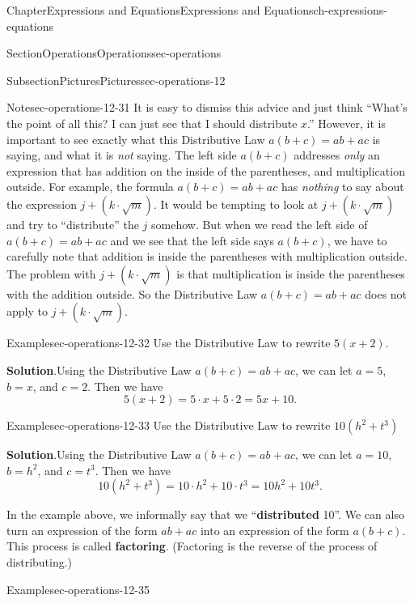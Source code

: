 \documentclass[twoside,11pt,]{book}
\newcommand{\blocktitlefont}{\relax}
\newcommand{\terminology}[1]{\textbf{#1}}
\numberwithin{equation}{chapter}
\begin{document}
\begin{chapterptx}{Chapter}{Expressions and Equations}{}{Expressions and Equations}{}{}{ch-expressions-equations}
\begin{sectionptx}{Section}{Operations}{}{Operations}{}{}{sec-operations}
\begin{subsectionptx}{Subsection}{Pictures}{}{Pictures}{}{}{sec-operations-12}
\begin{note}{Note}{}{sec-operations-12-31}
It is easy to dismiss this advice and just think ``What's the point of all this? I can just see that I should distribute \(x\).'' However, it is important to see exactly what this Distributive Law \(a(b+c)=ab+ac\) is saying, and what it is \emph{not} saying. The left side \(a(b+c)\) addresses \emph{only} an expression that has addition on the inside of the parentheses, and multiplication outside. For example, the formula \(a(b+c)=ab+ac\) has \emph{nothing} to say about the expression \(j + (k \cdot \sqrt{m})\). It would be tempting to look at \(j + (k \cdot \sqrt{m})\) and try to ``distribute'' the \(j\) somehow. But when we read the left side of \(a(b+c)=ab+ac\) and we see that the left side says \(a(b+c)\), we have to carefully note that addition is inside the parentheses with multiplication outside. The problem with \(j + (k \cdot \sqrt{m})\) is that multiplication is inside the parentheses with the addition outside. So the Distributive Law \(a(b+c)=ab+ac\) does not apply to \(j + (k \cdot \sqrt{m})\).%
\end{note}
\begin{example}{Example}{}{sec-operations-12-32}%
Use the Distributive Law to rewrite \(5(x + 2)\).%
\par\smallskip%
\noindent\textbf{\blocktitlefont Solution}.\hypertarget{sec-operations-12-32-2}{}\quad{}Using the Distributive Law \(a(b+c)=ab+ac\), we can let \(a=5\), \(b=x\), and \(c=2\). Then we have%
\begin{equation*}
5(x + 2) = 5 \cdot x + 5 \cdot 2 = 5x + 10.
\end{equation*}
%
\end{example}
\begin{example}{Example}{}{sec-operations-12-33}%
Use the Distributive Law to rewrite \(10(h^2 + t^3)\)%
\par\smallskip%
\noindent\textbf{\blocktitlefont Solution}.\hypertarget{sec-operations-12-33-2}{}\quad{}Using the Distributive Law \(a(b+c)=ab+ac\), we can let \(a=10\), \(b=h^2\), and \(c=t^3\). Then we have%
\begin{equation*}
10(h^2 + t^3) = 10 \cdot h^2 + 10 \cdot t^3 = 10h^2 + 10t^3.
\end{equation*}
%
\end{example}
In the example above, we informally say that we ``\terminology{distributed} 10''. We can also turn an expression of the form \(ab + ac\) into an expression of the form \(a(b+c)\). This process is called \terminology{factoring}. (Factoring is the reverse of the process of distributing.)%
\begin{example}{Example}{}{sec-operations-12-35}%

\end{example}
\end{subsectionptx}
\end{sectionptx}
\end{chapterptx}
\end{document}
